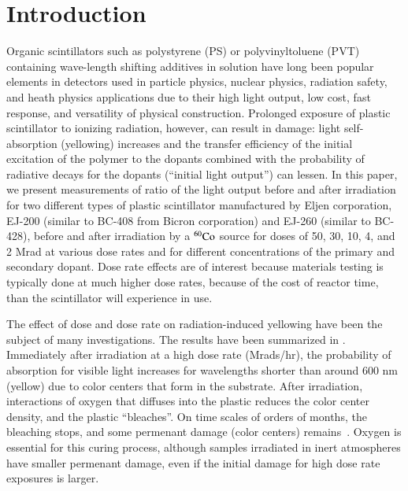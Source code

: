 \documentclass[review]{elsarticle}
\begin{document}
\section{Introduction}
Organic scintillators such as polystyrene (PS) or polyvinyltoluene (PVT)
containing wave-length shifting
additives in solution have long been popular elements in detectors used
in particle physics, nuclear physics, radiation safety, and heath physics applications  due to their high light output, low cost, fast response,
and versatility of physical construction. 
Prolonged exposure of plastic scintillator to
ionizing radiation, however, can result in damage:
light self-absorption (yellowing) increases and
the transfer efficiency of the initial excitation of the polymer to the
dopants combined with the probability of radiative decays for the dopants (``initial light output'') can lessen.  
In this paper, we present measurements of ratio of the light output before and after irradiation
for two different types of plastic scintillator manufactured by Eljen corporation, EJ-200 (similar to BC-408 from Bicron corporation) and EJ-260 (similar to BC-428), before and after irradiation by a $\rm {^{60}Co}$ source for doses of 50, 30, 10, 4, and 2 Mrad at various dose rates and for different concentrations of the primary and secondary dopant.
Dose rate effects are of interest because materials testing is typically done at much higher dose rates, because of the cost of reactor time, than the scintillator will experience in use.

The effect of dose and dose rate on radiation-induced yellowing have been the subject of many investigations. The results have been summarized in \cite{sauli}.  Immediately after irradiation at a high dose rate (Mrads/hr), 
the probability of absorption for visible light increases for wavelengths shorter than around 600 nm (yellow) due to color centers that form in the substrate\cite{Bross199135}.  
After irradiation, interactions of oxygen that diffuses into the plastic reduces the color center density, and the plastic ``bleaches''.  On time scales of orders of months, the bleaching stops, and some permenant damage (color centers) remains~\cite{sauli}.
Oxygen is essential for this curing process, although samples irradiated in inert atmospheres have smaller permenant damage, even if the initial damage for high dose rate exposures is larger\cite{zorn2}.  
\end{document}
